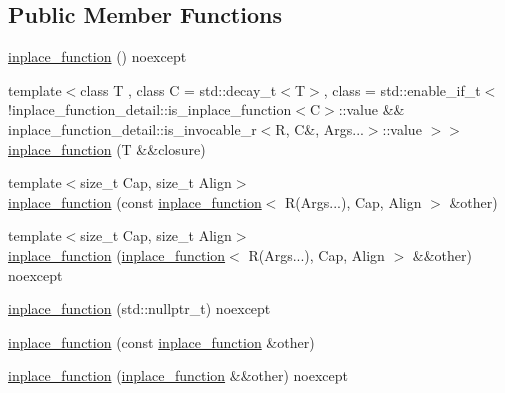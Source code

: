 \subsection*{Public Member Functions}
\begin{DoxyCompactItemize}
\item 
\hyperlink{classstdext_1_1inplace__function_3_01R_07Args_8_8_8_08_00_01Capacity_00_01Alignment_01_4_a4f0aa2830789ae07d6eaa554e3665865}{inplace\+\_\+function} () noexcept
\item 
{\footnotesize template$<$class T , class C  = std\+::decay\+\_\+t$<$\+T$>$, class  = std\+::enable\+\_\+if\+\_\+t$<$            !inplace\+\_\+function\+\_\+detail\+::is\+\_\+inplace\+\_\+function$<$\+C$>$\+::value            \&\& inplace\+\_\+function\+\_\+detail\+::is\+\_\+invocable\+\_\+r$<$\+R, C\&, Args...$>$\+::value        $>$$>$ }\\\hyperlink{classstdext_1_1inplace__function_3_01R_07Args_8_8_8_08_00_01Capacity_00_01Alignment_01_4_a28bb1c55b24a4056b128be868af7794b}{inplace\+\_\+function} (T \&\&closure)
\item 
{\footnotesize template$<$size\+\_\+t Cap, size\+\_\+t Align$>$ }\\\hyperlink{classstdext_1_1inplace__function_3_01R_07Args_8_8_8_08_00_01Capacity_00_01Alignment_01_4_adc64caf861ce3703357c901c4691ace7}{inplace\+\_\+function} (const \hyperlink{classstdext_1_1inplace__function}{inplace\+\_\+function}$<$ R(Args...), Cap, Align $>$ \&other)
\item 
{\footnotesize template$<$size\+\_\+t Cap, size\+\_\+t Align$>$ }\\\hyperlink{classstdext_1_1inplace__function_3_01R_07Args_8_8_8_08_00_01Capacity_00_01Alignment_01_4_adeb6b2419556c7826ca7cd04c3b5ef2e}{inplace\+\_\+function} (\hyperlink{classstdext_1_1inplace__function}{inplace\+\_\+function}$<$ R(Args...), Cap, Align $>$ \&\&other) noexcept
\item 
\hyperlink{classstdext_1_1inplace__function_3_01R_07Args_8_8_8_08_00_01Capacity_00_01Alignment_01_4_a7bd44c3a16e8c7312be0cc3ae1e0d387}{inplace\+\_\+function} (std\+::nullptr\+\_\+t) noexcept
\item 
\hyperlink{classstdext_1_1inplace__function_3_01R_07Args_8_8_8_08_00_01Capacity_00_01Alignment_01_4_a1ccbc60554d934faf7c8e4188f6141b0}{inplace\+\_\+function} (const \hyperlink{classstdext_1_1inplace__function}{inplace\+\_\+function} \&other)
\item 
\hyperlink{classstdext_1_1inplace__function_3_01R_07Args_8_8_8_08_00_01Capacity_00_01Alignment_01_4_a9c97182aafdffc26da1f569830bf01bb}{inplace\+\_\+function} (\hyperlink{classstdext_1_1inplace__function}{inplace\+\_\+function} \&\&other) noexcept

\end{DoxyCompactItemize}
